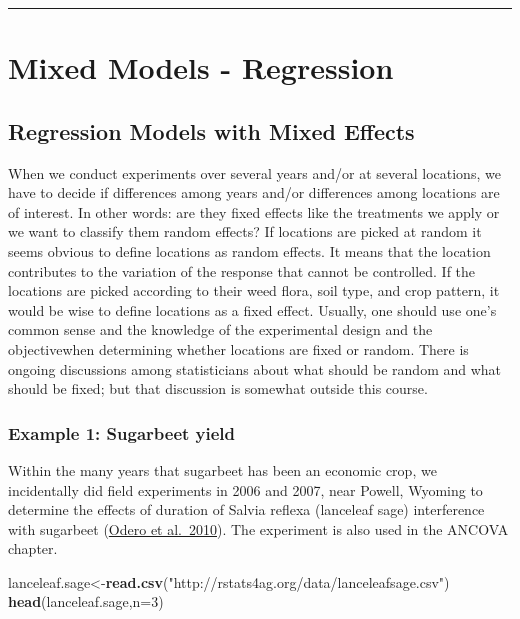 \documentclass[letterpaper,]{book}
\newenvironment{Shaded}{\begin{snugshade}}{\end{snugshade}}
\newcommand{\DataTypeTok}[1]{\textcolor[rgb]{0.13,0.29,0.53}{#1}}
\newcommand{\DecValTok}[1]{\textcolor[rgb]{0.00,0.00,0.81}{#1}}
\newcommand{\KeywordTok}[1]{\textcolor[rgb]{0.13,0.29,0.53}{\textbf{#1}}}
\newcommand{\NormalTok}[1]{#1}
\newcommand{\StringTok}[1]{\textcolor[rgb]{0.31,0.60,0.02}{#1}}
\begin{document}
\begin{center}\rule{0.5\linewidth}{0.5pt}\end{center}

\hypertarget{mixed-models---regression}{%
\chapter{Mixed Models - Regression}\label{mixed-models---regression}}

\hypertarget{regression-models-with-mixed-effects}{%
\section{Regression Models with Mixed Effects}\label{regression-models-with-mixed-effects}}

When we conduct experiments over several years and/or at several locations, we have to decide if differences among years and/or differences among locations are of interest. In other words: are they fixed effects like the treatments we apply or we want to classify them random effects? If locations are picked at random it seems obvious to define locations as random effects. It means that the location contributes to the variation of the response that cannot be controlled. If the locations are picked according to their weed flora, soil type, and crop pattern, it would be wise to define locations as a fixed effect. Usually, one should use one's common sense and the knowledge of the experimental design and the objectivewhen determining whether locations are fixed or random. There is ongoing discussions among statisticians about what should be random and what should be fixed; but that discussion is somewhat outside this course.

\hypertarget{mixedregressionex1}{%
\subsection{Example 1: Sugarbeet yield}\label{mixedregressionex1}}

Within the many years that sugarbeet has been an economic crop, we incidentally did field experiments in 2006 and 2007, near Powell, Wyoming to determine the effects of duration of Salvia reflexa (lanceleaf sage) interference with sugarbeet (\href{http://www.bioone.org/doi/abs/10.1614/WT-D-10-00015.1}{Odero et al.~2010}). The experiment is also used in the ANCOVA chapter.

\begin{Shaded}
\begin{Highlighting}[]
\NormalTok{lanceleaf.sage<-}\KeywordTok{read.csv}\NormalTok{(}\StringTok{"http://rstats4ag.org/data/lanceleafsage.csv"}\NormalTok{)}
\KeywordTok{head}\NormalTok{(lanceleaf.sage,}\DataTypeTok{n=}\DecValTok{3}\NormalTok{)}
\end{Highlighting}
\end{Shaded}
\end{document}
